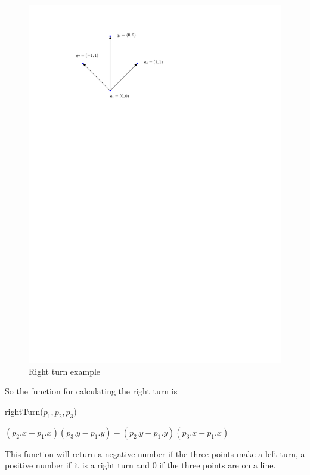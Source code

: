 \begin{figure}[H]
    \centering
	\includegraphics{figures/rightturn3.pdf}
	\caption{Right turn example}
    \label{rightturn3}
\end{figure}
So the function for calculating the right turn is
\begin{algorithm} 
	\caption{rightTurn($p_1,p_2,p_3$)}
	\begin{algorithmic}[1] 
		\State \Return $(p_2.x-p_1.x)(p_3.y-p_1.y)-(p_2.y-p_1.y)(p_3.x-p_1.x)$
	\end{algorithmic}
\end{algorithm}

This function will return a negative number if the three points make a left
turn, a positive number if it is a right turn and 0 if the three points are on
a line.

